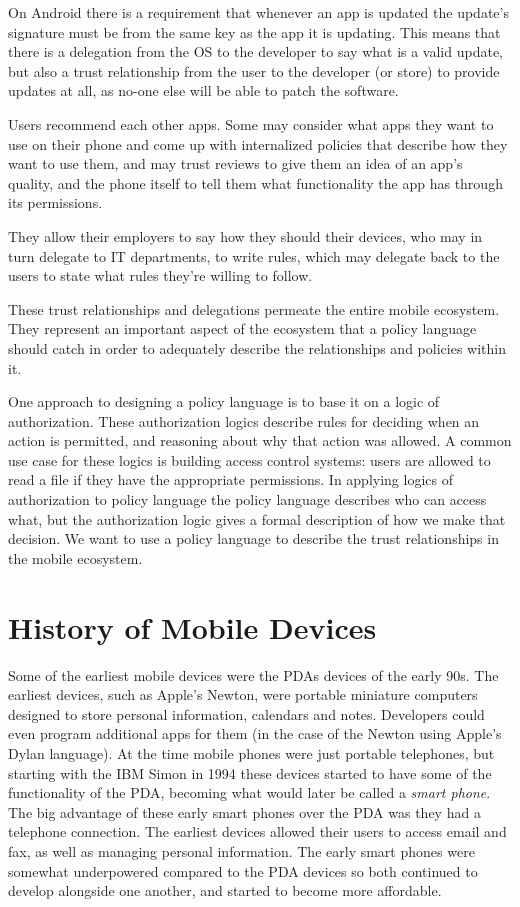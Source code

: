 \documentclass[thesis.tex]{subfiles}
\begin{document}
On Android there is a requirement that whenever
an app is updated the update's signature must be from the same key as
the app it is updating.  This means that there is a delegation from
the OS to the developer to say what is a valid update, but also a
trust relationship from the user to the developer (or store) to
provide updates at all, as no-one else will be able to patch the
software.

Users recommend each other apps.  Some may consider what apps they
want to use on their phone and come up with internalized policies that
describe how they want to use them, and may trust reviews to give them
an idea of an app's quality, and the phone itself to tell them what
functionality the app has through its permissions.

They allow their employers to say how they should their devices, who
may in turn delegate to IT departments, to write rules, which may
delegate back to the users to state what rules they're willing to
follow.

These trust relationships and delegations permeate the entire mobile
ecosystem.  They represent an important aspect of the ecosystem that a
policy language should catch in order to adequately describe the
relationships and policies within it.

One approach to designing a policy language is to base it on a logic of
authorization. These authorization logics describe rules for deciding when an
action is permitted, and reasoning about why that action was allowed. A common
use case for these logics is building access control systems: users are allowed
to read a file if they have the appropriate permissions. In applying logics of
authorization to policy language the policy language describes who can access
what, but the authorization logic gives a formal description of how we make that
decision. We want to use a policy language to describe the trust relationships
in the mobile ecosystem.


\section{History of Mobile Devices}

Some of the earliest mobile devices were the \acp{PDA} devices of the
early 90s.  The earliest devices, such as Apple's Newton, were
portable miniature computers designed to store personal information,
calendars and notes.  Developers could even program additional apps
for them (in the case of the Newton using Apple's Dylan language).  At
the time mobile phones were just portable telephones, but starting
with the IBM Simon in 1994 these devices started to have some of the
functionality of the \ac{PDA}, becoming what would later be called a
\emph{smart phone}.  The big advantage of these early smart phones
over the \ac{PDA} was they had a telephone connection.  The earliest
devices allowed their users to access email and fax, as well as
managing personal information.  The early smart phones were somewhat
underpowered compared to the \ac{PDA} devices so both continued to
develop alongside one another, and started to become more affordable.
\end{document}
